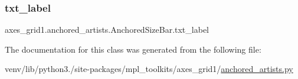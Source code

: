 \subsubsection{\texorpdfstring{txt\+\_\+label}{txt\_label}}
{\footnotesize\ttfamily axes\+\_\+grid1.\+anchored\+\_\+artists.\+Anchored\+Size\+Bar.\+txt\+\_\+label}



The documentation for this class was generated from the following file\+:\begin{DoxyCompactItemize}
\item 
venv/lib/python3./site-\/packages/mpl\+\_\+toolkits/axes\+\_\+grid1/\hyperlink{_2anchored__artists_8py}{anchored\+\_\+artists.\+py}\end{DoxyCompactItemize}

